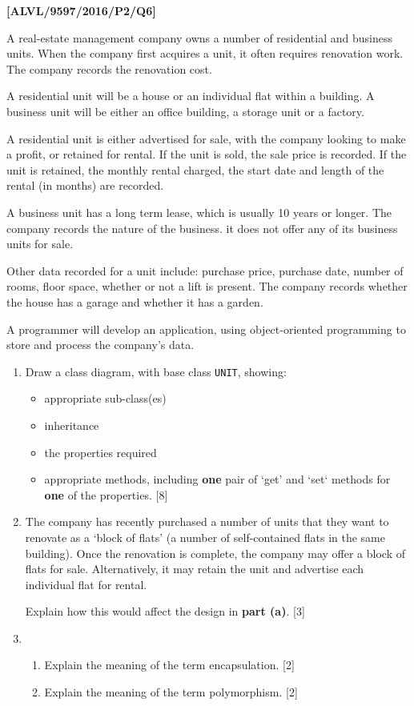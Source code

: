 \item \textbf{{[}ALVL/9597/2016/P2/Q6{]} }

A real-estate management company owns a number of residential and
business units. When the company first acquires a unit, it often requires
renovation work. The company records the renovation cost.

A residential unit will be a house or an individual flat within a
building. A business unit will be either an office building, a storage
unit or a factory.

A residential unit is either advertised for sale, with the company
looking to make a profit, or retained for rental. If the unit is sold,
the sale price is recorded. If the unit is retained, the monthly rental
charged, the start date and length of the rental (in months) are recorded.

A business unit has a long term lease, which is usually 10 years or
longer. The company records the nature of the business. it does not
offer any of its business units for sale. 

Other data recorded for a unit include: purchase price, purchase date,
number of rooms, floor space, whether or not a lift is present. The
company records whether the house has a garage and whether it has
a garden. 

A programmer will develop an application, using object-oriented programming
to store and process the company\textquoteright s data. 
\begin{enumerate}
\item Draw a class diagram, with base class \texttt{UNIT}, showing: 
\begin{itemize}
\item appropriate sub-class(es)
\item inheritance 
\item the properties required 
\item appropriate methods, including \textbf{one} pair of \textquoteleft get\textquoteright{}
and \textquoteleft set\textquoteleft{} methods for \textbf{one} of
the properties.\hfill{} {[}8{]}
\end{itemize}
\item The company has recently purchased a number of units that they want
to renovate as a \textquoteleft block of flats\textquoteright{} (a
number of self-contained flats in the same building). Once the renovation
is complete, the company may offer a block of flats for sale. Alternatively,
it may retain the unit and advertise each individual flat for rental. 

Explain how this would affect the design in \textbf{part (a)}. \hfill{}{[}3{]}
\item {}
\begin{enumerate}
\item Explain the meaning of the term encapsulation. \hfill{}{[}2{]}
\item Explain the meaning of the term polymorphism. \hfill{}{[}2{]}
\end{enumerate}
\end{enumerate}